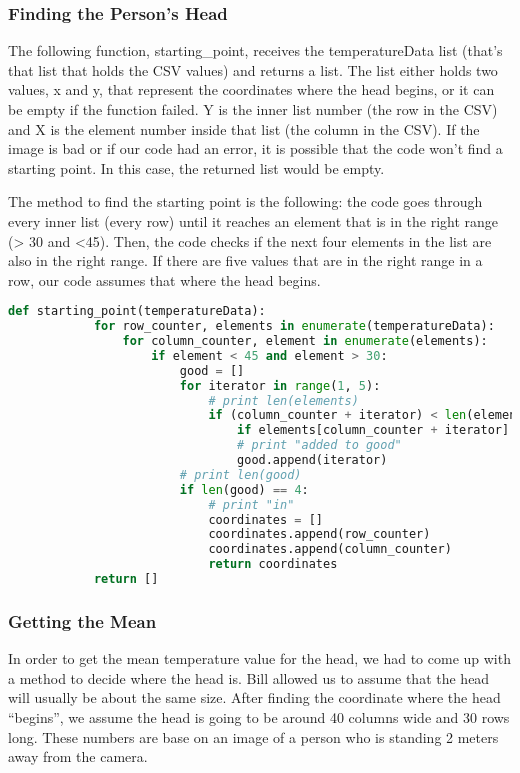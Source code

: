 	
\subsubsection*{Finding the Person’s Head}
	The following function, starting\_point, receives the temperatureData list (that’s that list that holds the CSV values) and returns a list. The list either holds two values, x and y, that represent the coordinates where the head begins, or it can be empty if the function failed. Y is the inner list number (the row in the CSV) and X is the element number inside that list (the column in the CSV). If the image is bad or if our code had an error, it is possible that the code won’t find a starting point. In this case, the returned list would be empty. 
	
	The method to find the starting point is the following: the code goes through every inner list (every row) until it reaches an element that is in the right range (> 30 and <45). Then, the code checks if the next four elements in the list are also in the right range. If there are five values that are in the right range in a row, our code assumes that where the head begins. 
	
	\begin{lstlisting}[language=Python, caption=Python example]
		def starting_point(temperatureData):
			for row_counter, elements in enumerate(temperatureData):
				for column_counter, element in enumerate(elements):
					if element < 45 and element > 30:
						good = []
						for iterator in range(1, 5):
							# print len(elements)
							if (column_counter + iterator) < len(elements):
								if elements[column_counter + iterator] < 45 and elements[column_counter + iterator] > 30:
								# print "added to good"
								good.append(iterator)
						# print len(good)
						if len(good) == 4:
							# print "in"
							coordinates = []
							coordinates.append(row_counter)
							coordinates.append(column_counter)
							return coordinates
			return []
	\end{lstlisting}
	
	
	
\subsubsection*{Getting the Mean }
	In order to get the mean temperature value for the head, we had to come up with a method to decide where the head is. Bill allowed us to assume that the head will usually be about the same size. After finding the coordinate where the head “begins”, we assume the head is going to be around 40 columns wide and 30 rows long. These numbers are base on an image of a person who is standing 2 meters away from the camera. 
	
